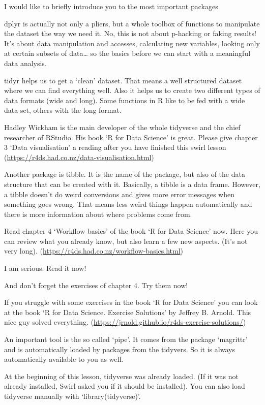 I would like to briefly introduce you to the most important packages

dplyr is actually not only a pliers, but a whole toolbox of functions to manipulate the dataset the way we need it. No, this is not about p-hacking or faking results! It’s about data manipulation and accesses, calculating new variables, looking only at certain subsets of data… so the basics before we can start with a meaningful data analysis.

tidyr helps us to get a ‘clean’ dataset. That means a well structured dataset where we can find everything well. Also it helps us to create two different types of data formats (wide and long). Some functions in R like to be fed with a wide data set, others with the long format.

Hadley Wickham is the main developer of the whole tidyverse and the chief researcher of RStudio. His book ‘R for Data Science’ is great. Please give chapter 3 ‘Data visualisation’ a reading after you have finished this swirl lesson (\url{https://r4ds.had.co.nz/data-visualisation.html})

Another package is tibble. It is the name of the package, but also of the data structure that can be created with it. Basically, a tibble is a data frame. However, a tibble doesn’t do weird conversions and gives more error messages when something goes wrong. That means less weird things happen automatically and there is more information about where problems come from.

Read chapter 4 ‘Workflow basics’ of the book ‘R for Data Science’ now. Here you can review what you already know, but also learn a few new aspects. (It’s not very long). (\url{https://r4ds.had.co.nz/workflow-basics.html})

I am serious. Read it now!

And don’t forget the exercises of chapter 4. Try them now!

If you struggle with some exercises in the book ‘R for Data Science’ you can look at the book ‘R for Data Science. Exercise Solutions’ by Jeffrey B. Arnold. This nice guy solved everything. (\url{https://jrnold.github.io/r4ds-exercise-solutions/})

An important tool is the so called ‘pipe’. It comes from the package ‘magrittr’ and is automatically loaded by packages from the tidyvers. So it is always automatically available to you as well.

At the beginning of this lesson, tidyverse was already loaded. (If it was not already installed, Swirl asked you if it should be installed). You can also load tidyverse manually with ‘library(tidyverse)’.

